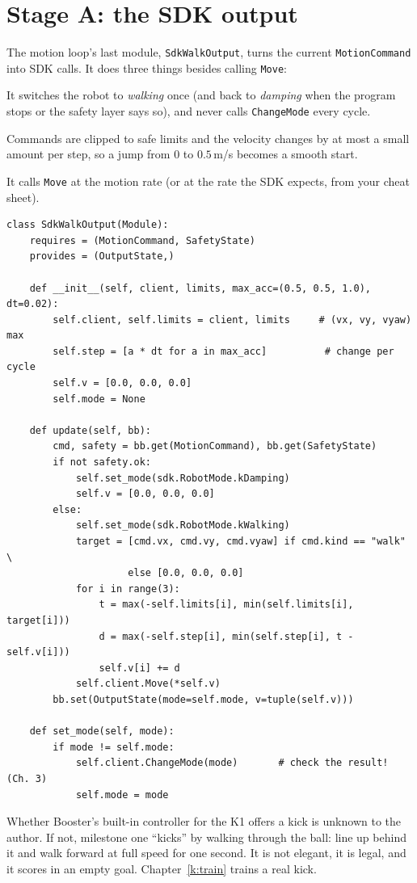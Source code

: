 \section*{Stage A: the SDK output}
The motion loop's last module, \texttt{SdkWalkOutput}, turns the current \texttt{MotionCommand} into SDK calls. It does three things besides calling \verb!Move!:
\begin{description}[leftmargin=0.6cm]
  \item[Mode handling.] It switches the robot to \emph{walking} once (and back to \emph{damping} when the program stops or the safety layer says so), and never calls \verb!ChangeMode! every cycle.
  \item[Limits and ramps.] Commands are clipped to safe limits and the velocity changes by at most a small amount per step, so a jump from $0$ to $0.5$\,m/s becomes a smooth start.
  \item[Rate.] It calls \verb!Move! at the motion rate (or at the rate the SDK expects, from your cheat sheet).
\end{description}
\begin{verbatim}
class SdkWalkOutput(Module):
    requires = (MotionCommand, SafetyState)
    provides = (OutputState,)

    def __init__(self, client, limits, max_acc=(0.5, 0.5, 1.0), dt=0.02):
        self.client, self.limits = client, limits     # (vx, vy, vyaw) max
        self.step = [a * dt for a in max_acc]          # change per cycle
        self.v = [0.0, 0.0, 0.0]
        self.mode = None

    def update(self, bb):
        cmd, safety = bb.get(MotionCommand), bb.get(SafetyState)
        if not safety.ok:
            self.set_mode(sdk.RobotMode.kDamping)
            self.v = [0.0, 0.0, 0.0]
        else:
            self.set_mode(sdk.RobotMode.kWalking)
            target = [cmd.vx, cmd.vy, cmd.vyaw] if cmd.kind == "walk" \
                     else [0.0, 0.0, 0.0]
            for i in range(3):
                t = max(-self.limits[i], min(self.limits[i], target[i]))
                d = max(-self.step[i], min(self.step[i], t - self.v[i]))
                self.v[i] += d
            self.client.Move(*self.v)
        bb.set(OutputState(mode=self.mode, v=tuple(self.v)))

    def set_mode(self, mode):
        if mode != self.mode:
            self.client.ChangeMode(mode)       # check the result! (Ch. 3)
            self.mode = mode
\end{verbatim}
\begin{guessbox}
Whether Booster's built-in controller for the K1 offers a kick\guess{} is unknown to the author. If not, milestone one ``kicks'' by walking through the ball: line up behind it and walk forward at full speed for one second. It is not elegant, it is legal, and it scores in an empty goal. Chapter~\ref{k:train} trains a real kick.
\end{guessbox}

